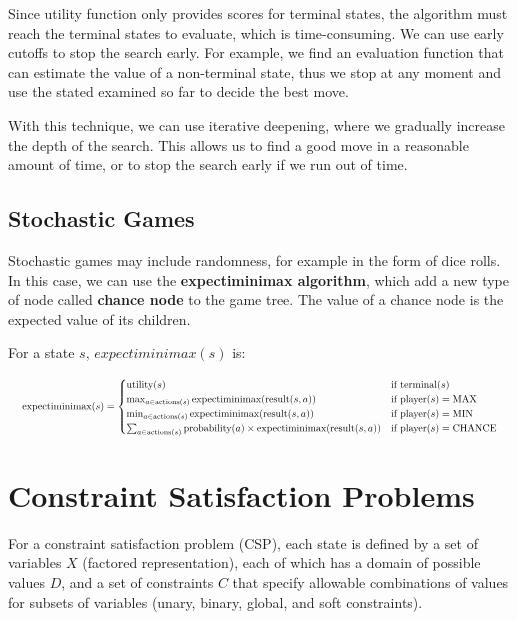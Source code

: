 \documentclass[a4paper,12pt]{article}
\begin{document}
Since utility function only provides scores for terminal states, the algorithm must reach the terminal states to evaluate, which is time-consuming. We can use early cutoffs to stop the search early. For example, we find an evaluation function that can estimate the value of a non-terminal state, thus we stop at any moment and use the stated examined so far to decide the best move.

With this technique, we can use iterative deepening, where we gradually increase the depth of the search. This allows us to find a good move in a reasonable amount of time, or to stop the search early if we run out of time.

\subsection{Stochastic Games}

Stochastic games may include randomness, for example in the form of dice rolls. In this case, we can use the \textbf{expectiminimax algorithm}, which add a new type of node called \textbf{chance node} to the game tree. The value of a chance node is the expected value of its children.

For a state $s$, $expectiminimax(s)$ is:

\begin{equation*}
  \resizebox{\linewidth}{!}{
    $\text{expectiminimax}(s) = \begin{cases}
      \text{utility}(s) & \text{if } \text{terminal}(s) \\
      \max_{a \in \text{actions}(s)} \text{expectiminimax}(\text{result}(s, a)) & \text{if } \text{player}(s) = \text{MAX} \\
      \min_{a \in \text{actions}(s)} \text{expectiminimax}(\text{result}(s, a)) & \text{if } \text{player}(s) = \text{MIN} \\
      \sum_{a \in \text{actions}(s)} \text{probability}(a) \times \text{expectiminimax}(\text{result}(s, a)) & \text{if } \text{player}(s) = \text{CHANCE}
    \end{cases}$
  }
\end{equation*}

\section{Constraint Satisfaction Problems}

For a constraint satisfaction problem (CSP), each state is defined by a set of variables $X$ (factored representation), each of which has a domain of possible values $D$, and a set of constraints $C$ that specify allowable combinations of values for subsets of variables (unary, binary, global, and soft constraints).
\end{document}
